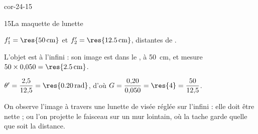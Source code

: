 \begin{blocLivre}{cor-24-15}
\begin{corrige}{15}{La maquette de lunette}
\begin{questions}
\item $f'_1=\res{\qty{50}{cm}}$ et $f'_2=\res{\qty{12,5}{cm}}$, distantes de .
\item L'objet est à l'infini : son image est dans le , à \qty{50}{cm}, et mesure
$50\times0{,}050=\res{\qty{2,5}{cm}}$.
\item $\theta'=\dfrac{2{,}5}{12{,}5}=\res{\qty{0,20}{rad}}$, d'où $G=\dfrac{0{,}20}{0{,}050}=\res{4}=\dfrac{50}{12{,}5}$.
\item On observe l'image à travers une lunette de visée réglée sur l'infini : elle doit être nette ; ou l'on projette le
faisceau sur un mur lointain, où la tache garde  quelle que soit la distance.
\end{questions}
\end{corrige}
\end{blocLivre}
